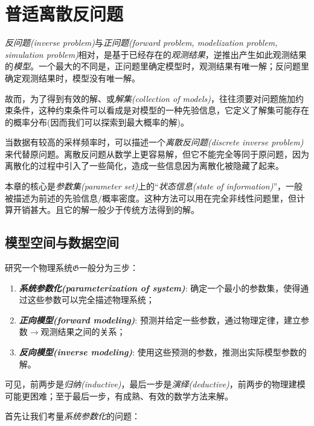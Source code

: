 \chapter{普适离散反问题}

\emph{反问题(inverse problem)}与\emph{正问题(forward problem, modelization problem, simulation problem)}相对，是基于已经存在的\emph{观测结果}，逆推出产生如此观测结果的\emph{模型}。一个最大的不同是，正问题里确定模型时，观测结果有唯一解；反问题里确定观测结果时，模型没有唯一解。

故而，为了得到有效的解、或\emph{解集(collection of models)}，往往须要对问题施加约束条件，这种约束条件可以看成是对模型的一种先验信息，它定义了解集可能存在的概率分布(因而我们可以探索到最大概率的解)。

当数据有较高的采样频率时，可以描述一个\emph{离散反问题(discrete inverse problem)}来代替原问题。离散反问题从数学上更容易解，但它不能完全等同于原问题，因为离散化的过程中引入了一些简化，造成一些信息因为离散化被隐藏了起来。

本章的核心是\emph{参数集(parameter set)}上的``\emph{状态信息(state of information)}''，一般被描述为前述的先验信息/概率密度。这种方法可以用在完全非线性问题里，但计算开销甚大。且它的解一般少于传统方法得到的解。

\section{模型空间与数据空间}
研究一个物理系统$\mathfrak{G}$一般分为三步：

\begin{enumerate}
  \item \textbf{\emph{系统参数化(parameterization of system)}}: 确定一个最小的参数集，使得通过这些参数可以完全描述物理系统；
  \item \textbf{\emph{正向模型(forward modeling)}}: 预测并给定一些参数，通过物理定律，建立参数$\rightarrow$观测结果之间的关系；
  \item \textbf{\emph{反向模型(inverse modeling)}}: 使用这些预测的参数，推测出实际模型参数的解。
\end{enumerate}

可见，前两步是\emph{归纳(inductive)}，最后一步是\emph{演绎(deductive)}，前两步的物理建模可能更困难；至于最后一步，有成熟、有效的数学方法来解。

首先让我们考量\emph{系统参数化}的问题：


